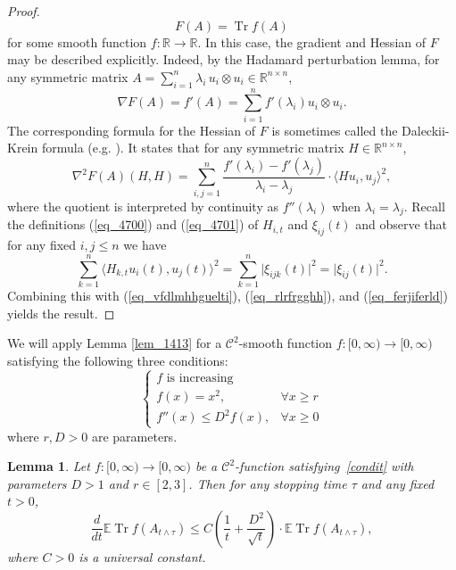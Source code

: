 \documentclass[12pt,a4paper]{article}
\newcommand{\Tr}{\mathop{\mathrm{Tr}}\nolimits}
\newcommand{\tr}{\mathop{\mathrm{Tr}}\nolimits}
\newcommand{\E}{\mathbb{E}}
\newcommand{\RR}{\mathbb{R}}
\newcommand{\R}{\mathbb{R}}
\newtheorem{lemma}[theorem]{Lemma}
\theoremstyle{definition}
\begin{document}
\begin{proof}
\[
F(A) = \Tr  f(A)
\]
for some smooth function $f\colon \R \to \R$. In this case, the gradient and Hessian 
of $F$  may be described explicitly.
Indeed, by the Hadamard perturbation lemma, for any symmetric matrix
$A = \sum_{i=1}^n \lambda_i \, u_i\otimes u_i \in \RR^{n \times n}$,
\begin{equation}\label{eq_rlrfrgghh}
\nabla F(A) = f'(A) = \sum_{i=1}^n f'(\lambda_i) u_i \otimes u_i.
\end{equation}
The corresponding formula 
for the Hessian of $F$ is sometimes called the Daleckii-Krein formula (e.g. \cite[Chapter V]{bhatia}). It  states that for any symmetric matrix $H \in \RR^{n \times n}$,
\begin{equation}\label{eq_ferjiferld}
\nabla^2 F ( A ) ( H , H )
= \sum_{i,j=1}^n \frac{ f'(\lambda_i) - f'(\lambda_j)}{\lambda_i - \lambda_j} \cdot \langle Hu_i,u_j\rangle^2 ,
\end{equation}
where the quotient is interpreted by continuity as $f''(\lambda_i)$ when $\lambda_i = \lambda_j$.
Recall the definitions (\ref{eq_4700}) and (\ref{eq_4701})
of $H_{i,t}$ and $\xi_{ij}(t)$ and observe that for any fixed $i,j \leq n$ we have
\[
\sum_{k=1}^n \langle H_{k,t} u_i(t) , u_j(t) \rangle^2 = \sum_{k=1}^n \vert \xi_{ijk} (t) \vert^2= \vert \xi_{ij} (t) \vert^2.
\]
Combining this with (\ref{eq_vfdlmhhguelti}), (\ref{eq_rlrfrgghh}), and (\ref{eq_ferjiferld}) yields the result.
\end{proof}
%
We will apply Lemma \ref{lem_1413} for a $\mathcal C^2$-smooth function
$f: [0, \infty) \rightarrow [0,\infty)$ satisfying
the following three conditions:
\begin{equation}\label{condit}
\begin{cases}
f \text{ is increasing} \\
f(x) = x^2 , & \forall x \geq r \\
f''(x) \leq D^2 f(x) , & \forall x \geq 0 
\end{cases}
\end{equation}
where $r,D > 0$ are parameters.
%
\begin{lemma} \label{lem_key}
Let $f: [0, \infty) \rightarrow [0,\infty)$ be a $\mathcal C^2$-function satisfying~\eqref{condit} with parameters $D>1$ and $r\in[2,3]$. Then for any stopping time $\tau$ and any fixed $t > 0$,
\begin{equation} \frac{d}{dt} \E \tr f(A_{t\wedge \tau}) \leq C \left( \frac 1t + \frac{D^2}{\sqrt{t}} \right) \cdot \E \tr f(A_{t\wedge\tau}),
\label{eq_1414}
\end{equation}
where $C > 0$ is a universal constant.
\end{lemma}
\end{document}
